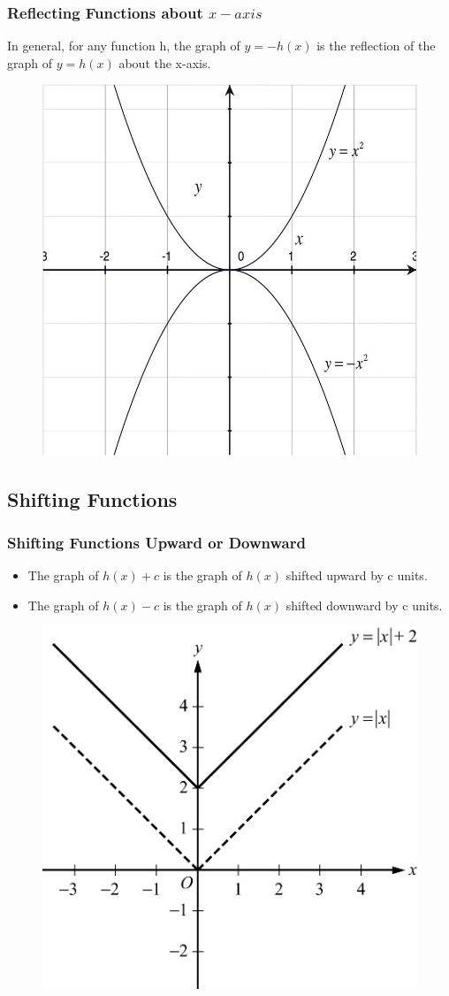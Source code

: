 \documentclass[
	11pt, %
	handout,
]{beamer}
\begin{document}
\begin{frame}
	\frametitle{Reflecting Functions about $x-axis$}
	\begin{theorem}
	In general, for any function h, the graph of $y = −h(x)$ is the reflection of the graph of $y = h(x)$ about the x-axis.
	\end{theorem}
	\begin{figure}
		\includegraphics[width=0.5\linewidth]{Reflection2.jpeg} 
	\end{figure}
\end{frame}


\subsection{Shifting Functions}
\begin{frame}
	\frametitle{Shifting Functions Upward or Downward}
	\begin{theorem}
		\begin{itemize}
			\item The graph of $h(x) + c$ is the graph of $h(x)$ shifted upward by c units. 
			\item The graph of $h(x) - c$ is the graph of $h(x)$ shifted downward by c units.
		\end{itemize}
	\end{theorem}
	

	\begin{figure}
		\includegraphics[width=0.5\linewidth]{Shifting_Function1.jpg} 
	\end{figure}

\end{frame}
\end{document}
